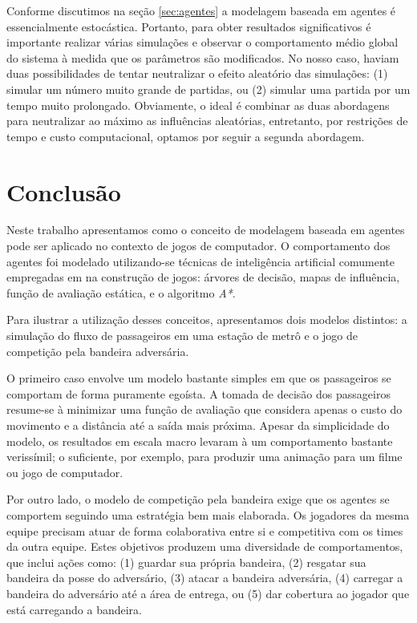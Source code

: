 \documentclass[preprint,12pt]{elsarticle}
\begin{document}
Conforme discutimos na seção \ref{sec:agentes} a modelagem baseada em agentes é essencialmente estocástica. Portanto, para obter resultados significativos é importante realizar várias simulações e observar o comportamento médio global do sistema à medida que os parâmetros são modificados. No nosso caso, haviam duas possibilidades de tentar neutralizar o efeito aleatório das simulações: (1) simular um número muito grande de partidas, ou (2) simular uma partida por um tempo muito prolongado. Obviamente, o ideal é combinar as duas abordagens para neutralizar ao máximo as influências aleatórias, entretanto, por restrições de tempo e custo computacional, optamos por seguir a segunda abordagem.

\section{Conclusão}
\label{sec:conclusao}

Neste trabalho apresentamos como o conceito de modelagem baseada em agentes pode ser aplicado no contexto de jogos de computador. O comportamento dos agentes foi modelado utilizando-se técnicas de inteligência artificial comumente empregadas em na construção de jogos: árvores de decisão, mapas de influência, função de avaliação estática, e o algoritmo \textit{A*}.

Para ilustrar a utilização desses conceitos, apresentamos dois modelos distintos: a simulação do fluxo de passageiros em uma estação de metrô e o jogo de competição pela bandeira adversária. 

O primeiro caso envolve um modelo bastante simples em que os passageiros se comportam de forma puramente egoísta. A tomada de decisão dos passageiros resume-se à minimizar uma função de avaliação que considera apenas o custo do movimento e a distância até a saída mais próxima. Apesar da simplicidade do modelo, os resultados em escala macro levaram à um comportamento bastante verissímil; o suficiente, por exemplo, para produzir uma animação para um filme ou jogo de computador.

Por outro lado, o modelo de competição pela bandeira exige que os agentes se comportem seguindo uma estratégia bem mais elaborada. Os jogadores da mesma equipe precisam atuar de forma colaborativa entre si e competitiva com os times da outra equipe. Estes objetivos produzem uma diversidade de comportamentos, que inclui ações como: (1) guardar sua própria bandeira, (2) resgatar sua bandeira da posse do adversário, (3) atacar a bandeira adversária, (4) carregar a bandeira do adversário até a área de entrega, ou (5) dar cobertura ao jogador que está carregando a bandeira. 
\end{document}
